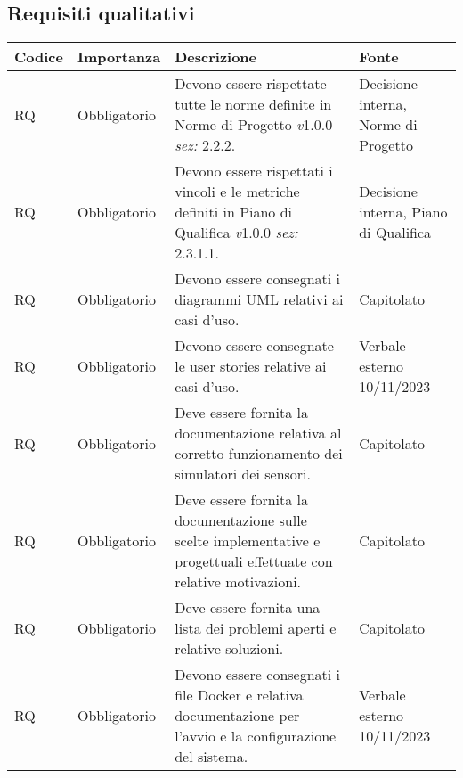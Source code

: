 \subsection{Requisiti qualitativi}
\setcounter{rowcounter}{0}
\begin{longtable}{|C{1.5cm}|C{2cm}|L{5cm}|C{2cm}|}
    \hline
    \textbf{Codice} & \textbf{Importanza} & \textbf{Descrizione} & \textbf{Fonte} \\

    \hline
     RQ & Obbligatorio & Devono essere rispettate tutte le norme definite in Norme di Progetto \textit{v}1.0.0 \textit{sez:} 2.2.2. & Decisione interna, Norme di Progetto\\

    \hline
     RQ & Obbligatorio & Devono essere rispettati i vincoli e le metriche definiti in Piano di Qualifica \textit{v}1.0.0 \textit{sez:} 2.3.1.1. & Decisione interna, Piano di Qualifica \\

    \hline
     RQ & Obbligatorio & Devono essere consegnati i diagrammi UML relativi ai casi d'uso. & Capitolato \\

    \hline
     RQ & Obbligatorio & Devono essere consegnate le user stories relative ai casi d'uso. & Verbale esterno 10/11/2023 \\

    \hline
     RQ & Obbligatorio & Deve essere fornita la documentazione relativa al corretto funzionamento dei simulatori dei sensori. & Capitolato \\

    \hline
     RQ & Obbligatorio & Deve essere fornita la documentazione sulle scelte implementative e progettuali effettuate con relative motivazioni. & Capitolato \\

    \hline
     RQ & Obbligatorio & Deve essere fornita una lista dei problemi aperti e relative soluzioni. & Capitolato \\

    \hline
     RQ & Obbligatorio & Devono essere consegnati i file Docker e relativa documentazione per l'avvio e la configurazione del sistema. & Verbale esterno 10/11/2023 \\


\end{longtable}
